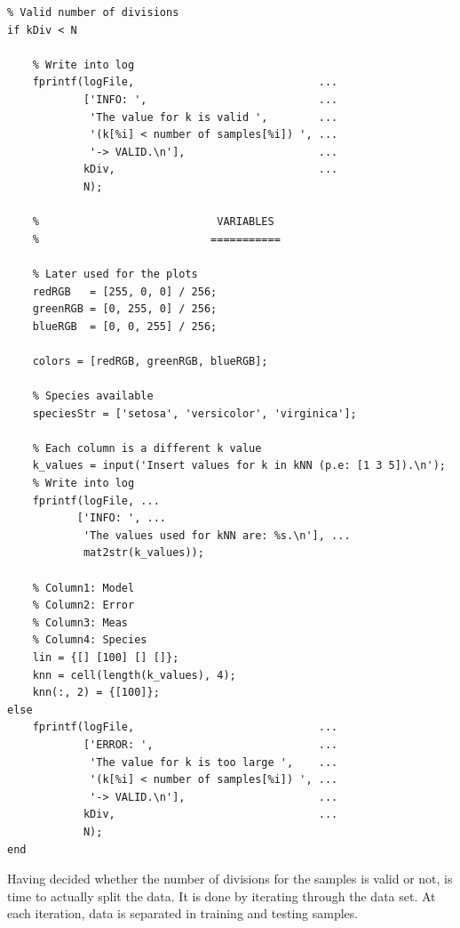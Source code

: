 \documentclass[11pt]{article}
\begin{document}
\begin{verbatim}
% Valid number of divisions
if kDiv < N
    
    % Write into log
    fprintf(logFile,                             ...
            ['INFO: ',                           ...
             'The value for k is valid ',        ...
             '(k[%i] < number of samples[%i]) ', ...
             '-> VALID.\n'],                     ...
            kDiv,                                ...
            N);
    
    %                            VARIABLES
    %                           ===========
    
    % Later used for the plots
    redRGB   = [255, 0, 0] / 256;
    greenRGB = [0, 255, 0] / 256;
    blueRGB  = [0, 0, 255] / 256;
    
    colors = [redRGB, greenRGB, blueRGB];
          
    % Species available
    speciesStr = ['setosa', 'versicolor', 'virginica'];
    
    % Each column is a different k value
    k_values = input('Insert values for k in kNN (p.e: [1 3 5]).\n');
    % Write into log
    fprintf(logFile, ...
           ['INFO: ', ...
            'The values used for kNN are: %s.\n'], ...
            mat2str(k_values));
    
    % Column1: Model
    % Column2: Error
    % Column3: Meas
    % Column4: Species
    lin = {[] [100] [] []};
    knn = cell(length(k_values), 4);
    knn(:, 2) = {[100]};
else
    fprintf(logFile,                             ...
            ['ERROR: ',                          ...
             'The value for k is too large ',    ...
             '(k[%i] < number of samples[%i]) ', ...
             '-> VALID.\n'],                     ...
            kDiv,                                ...
            N);
end
\end{verbatim}

Having decided whether the number of divisions for the samples is valid or not,
is time to actually split the data. It is done by iterating through the data
set. At each iteration, data is separated in training and testing samples.
 
\end{document}
